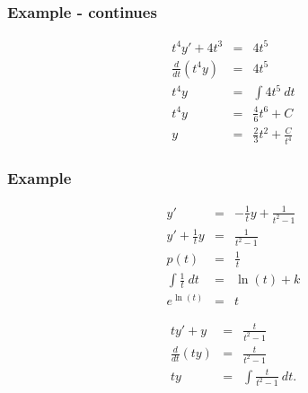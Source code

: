\documentclass{beamer}
\newcommand{\lp}{\left(}
\newcommand{\rp}{\right)}
\begin{document}
\begin{frame}
  \frametitle{Example - continues}

  \begin{eqnarray*}
    t^4 y' + 4t^3& = & 4 t^5 \\
    \frac{d}{dt} \lp t^4 y \rp & = & 4 t^5 \\
    t^4 y & = & \int 4 t^5 ~ dt \\
    t^4 y & = & \frac{4}{6} t^6 + C \\
    y & = & \frac{2}{3} t^2 + \frac{C}{t^4}
  \end{eqnarray*}

\end{frame}



\begin{frame}
  \frametitle{Example}

  \vspace*{-3em}
  \begin{eqnarray*}
    y' & = & -\frac{1}{t} y + \frac{1}{t^2 -1} \\
    y' + \frac{1}{t} y & = & \frac{1}{t^2 -1} \\
    p(t) & = & \frac{1}{t} \\
    \int \frac{1}{t} ~ dt & = & \ln(t) + k \\
    e^{\ln(t)} & = & t
  \end{eqnarray*}

  \begin{eqnarray*}
    t y' + y & = & \frac{t}{t^2-1} \\
    \frac{d}{dt} \lp t y \rp & = & \frac{t}{t^2-1} \\
    t y & = & \int \frac{t}{t^2-1} ~ dt.
  \end{eqnarray*}

\end{frame}
\end{document}
